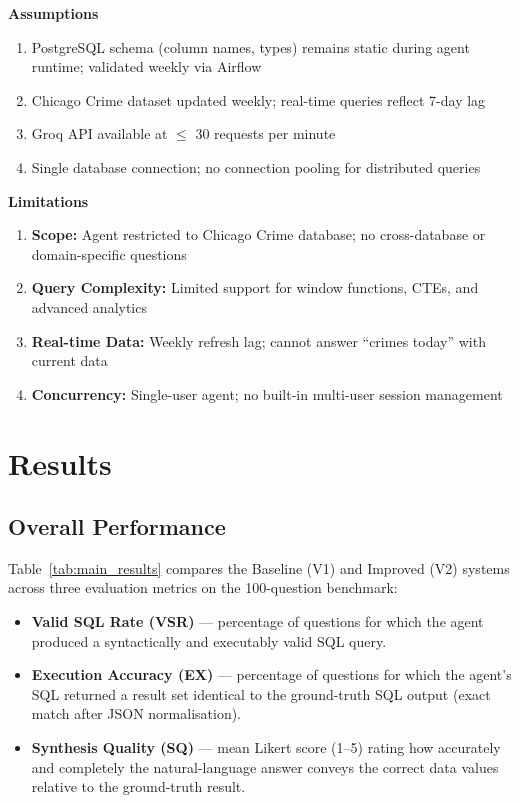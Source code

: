 \documentclass{article}
\begin{document}
\noindent\textbf{Assumptions}

\begin{enumerate}
    \item PostgreSQL schema (column names, types) remains static during agent runtime; validated weekly via Airflow
    \item Chicago Crime dataset updated weekly; real-time queries reflect 7-day lag
    \item Groq API available at $\leq$ 30 requests per minute
    \item Single database connection; no connection pooling for distributed queries
\end{enumerate}

\noindent\textbf{Limitations}

\begin{enumerate}
    \item \textbf{Scope:} Agent restricted to Chicago Crime database; no cross-database or domain-specific questions
    \item \textbf{Query Complexity:} Limited support for window functions, CTEs, and advanced analytics
    \item \textbf{Real-time Data:} Weekly refresh lag; cannot answer ``crimes today'' with current data
    \item \textbf{Concurrency:} Single-user agent; no built-in multi-user session management
\end{enumerate}

\section{Results}

\subsection{Overall Performance}

Table~\ref{tab:main_results} compares the Baseline (V1) and Improved (V2) systems across three evaluation metrics on the 100-question benchmark:

\begin{itemize}
  \item \textbf{Valid SQL Rate (VSR)} --- percentage of questions for which the agent produced a syntactically and executably valid SQL query.
  \item \textbf{Execution Accuracy (EX)} --- percentage of questions for which the agent's SQL returned a result set identical to the ground-truth SQL output (exact match after JSON normalisation).
  \item \textbf{Synthesis Quality (SQ)} --- mean Likert score (1--5) rating how accurately and completely the natural-language answer conveys the correct data values relative to the ground-truth result.
\end{itemize}
\end{document}
